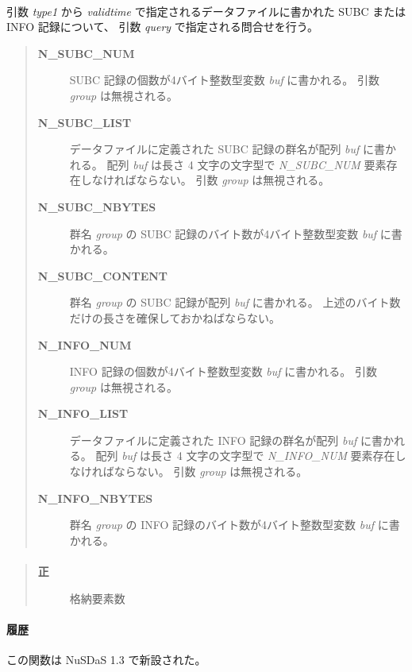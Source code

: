 \paragraph{\FuncDesc}
引数 {\it type1} から {\it validtime} で指定されるデータファイルに書かれた
SUBC または INFO 記録について、
引数 {\it query} で指定される問合せを行う。
\begin{quote}\begin{description}
\item[{\bf N\_SUBC\_NUM}] 
SUBC 記録の個数が4バイト整数型変数 {\it buf} に書かれる。
引数 {\it group} は無視される。
\item[{\bf N\_SUBC\_LIST}] 
データファイルに定義された SUBC 記録の群名が配列 {\it buf} に書かれる。
配列 {\it buf} は長さ 4 文字の文字型で
{\it N\_SUBC\_NUM} 要素存在しなければならない。
引数 {\it group} は無視される。
\item[{\bf N\_SUBC\_NBYTES}] 
群名 {\it group} の SUBC 記録のバイト数が4バイト整数型変数 {\it buf} に書かれる。
\item[{\bf N\_SUBC\_CONTENT}] 
群名 {\it group} の SUBC 記録が配列 {\it buf} に書かれる。
上述のバイト数だけの長さを確保しておかねばならない。
\item[{\bf N\_INFO\_NUM}] 
INFO 記録の個数が4バイト整数型変数 {\it buf} に書かれる。
引数 {\it group} は無視される。
\item[{\bf N\_INFO\_LIST}] 
データファイルに定義された INFO 記録の群名が配列 {\it buf} に書かれる。
配列 {\it buf} は長さ 4 文字の文字型で
{\it N\_INFO\_NUM} 要素存在しなければならない。
引数 {\it group} は無視される。
\item[{\bf N\_INFO\_NBYTES}] 
群名 {\it group} の INFO 記録のバイト数が4バイト整数型変数 {\it buf} に書かれる。
\end{description}\end{quote}

\paragraph{\ResultCode}
\begin{quote}
\begin{description}
\item[{\bf 正}] 格納要素数
\end{description}\end{quote}
\paragraph{履歴}
この関数は NuSDaS 1.3 で新設された。
